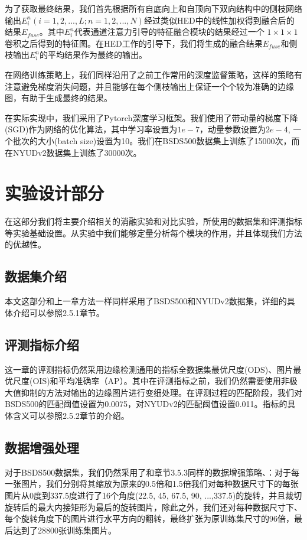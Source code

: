 \documentclass[master]{thesis-uestc}
\begin{document}
{为了获取最终结果，我们首先根据所有自底向上和自顶向下双向结构中的侧枝网络输出$E_{i}^{n} (i=1,2,...,L; n=1,2,...,N)$经过类似HED中的线性加权得到融合后的结果$E_{fuse}$。其中$E_{i}^{n}$代表通道注意力引导的特征融合模块的结果经过一个 $1 \times 1 \times 1$卷积之后得到的特征图。在HED工作的引导下，我们将生成的融合结果$E_{fuse}$和侧枝输出$E_{i}^{n}$的平均结果作为最终的输出。 

在网络训练策略上，我们同样沿用了之前工作常用的深度监督策略，这样的策略有注意避免梯度消失问题，并且能够在每个侧枝输出上保证一个个较为准确的边缘图，有助于生成最终的结果。

在实际实现中，我们采用了Pytorch深度学习框架。我们使用了带动量的梯度下降(SGD)作为网络的优化算法，其中学习率设置为$1e-7$，动量参数设置为$2e-4$, 一个批次的大小(batch size)设置为10。我们在BSDS500数据集上训练了15000次，而在NYUDv2数据集上训练了30000次。

\section{实验设计部分}
在这部分我们将主要介绍相关的消融实验和对比实验，所使用的数据集和评测指标等实验基础设置。从实验中我们能够定量分析每个模块的作用，并且体现我们方法的优越性。
\subsection{数据集介绍}
本文这部分和上一章方法一样同样采用了BSDS500和NYUDv2数据集，详细的具体介绍可以参照2.5.1章节。

\subsection{评测指标介绍}

这一章的评测指标仍然采用边缘检测通用的指标全数据集最优尺度(ODS)、图片最优尺度(OIS)和平均准确率（AP）。其中在评测指标之前，我们仍然需要使用非极大值抑制的方法对输出的边缘图片进行变细处理。在评测过程的匹配阶段，我们对BSDS500的匹配阈值设置为0.0075，对NYUDv2的匹配阈值设置0.011。指标的具体含义可以参照2.5.2章节的介绍。

\subsection{数据增强处理}

对于BSDS500数据集，我们仍然采用了和章节3.5.3同样的数据增强策略、：对于每一张图片，我们分别将其缩放为原来的0.5倍和1.5倍我们对每种数据尺寸下的每张图片从0度到337.5度进行了16个角度(22.5, 45, 67.5, 90, ...,337.5)的旋转，并且裁切旋转后的最大内接矩形为最后的旋转图片，除此之外，我们还对每种数据尺寸下、每个旋转角度下的图片进行水平方向的翻转，最终扩张为原训练集尺寸的96倍，最后达到了28800张训练集图片。

}
\end{document}
